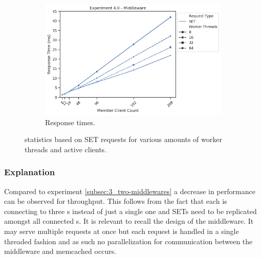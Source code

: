 \begin{figure}
{\begin{subfigure}[t!]{0.55\textwidth}
                    \includegraphics[width=1\textwidth]{../data_analysis/figures/4-0_mw_response_time.png}
                    \caption{Response times.\label{fig:sets_mw_rt}}
                \end{subfigure}
            \caption{\mw{} statistics based on SET requests for various amounts of worker threads and active
                     clients.\label{fig:mw_sets_sll}}
            }
        \end{figure}

        \subsubsection{Explanation\label{subsubsec:4_full-system_explanation}}

            Compared to experiment \ref{subsec:3_two-middlewares} a decrease in performance can be observed for
            throughput. This follows from the fact that each \mw{} is connecting to three \srv{}s instead of just a
            single one and SETs need to be replicated amongst all connected \srv{}s. It is relevant to recall the design
            of the middleware. It may serve multiple requests at once but each request is handled in a single threaded
            fashion and as such no parallelization for communication between the middleware and memcached occurs.


